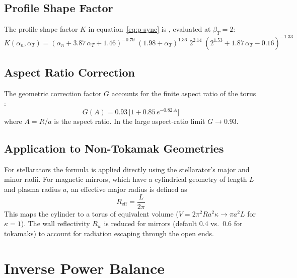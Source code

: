 \documentclass{article}
\begin{document}
\subsection{Profile Shape Factor}

The profile shape factor $K$ in equation~\eqref{eq:p-sync} is
\citep{albajar2001}, evaluated at $\beta_T = 2$:
%
\begin{equation}
\label{eq:K-factor}
K(\alpha_n, \alpha_T) =
  (\alpha_n + 3.87\,\alpha_T + 1.46)^{-0.79}\;
  (1.98 + \alpha_T)^{1.36}\;
  2^{2.14}\;
  (2^{1.53} + 1.87\,\alpha_T - 0.16)^{-1.33}
\end{equation}

\subsection{Aspect Ratio Correction}

The geometric correction factor $G$ accounts for the finite aspect
ratio of the torus \citep{albajar2001}:
%
\begin{equation}
\label{eq:G-factor}
G(A) = 0.93\,\bigl[1 + 0.85\,e^{-0.82\,A}\bigr]
\end{equation}
%
where $A = R/a$ is the aspect ratio. In the large aspect-ratio limit
$G \to 0.93$.

\subsection{Application to Non-Tokamak Geometries}

For stellarators the formula is applied directly using the
stellarator's major and minor radii. For magnetic mirrors, which have
a cylindrical geometry of length $L$ and plasma radius $a$, an
effective major radius is defined as
%
\begin{equation}
\label{eq:R-eff-mirror}
R_{\text{eff}} = \frac{L}{2\pi}
\end{equation}
%
This maps the cylinder to a torus of equivalent volume
($V = 2\pi^2 R a^2 \kappa \to \pi a^2 L$ for $\kappa = 1$). The
wall reflectivity $R_w$ is reduced for mirrors (default 0.4 vs.\ 0.6
for tokamaks) to account for radiation escaping through the open ends.


\section{Inverse Power Balance}
\label{sec:inverse-balance}
\end{document}
